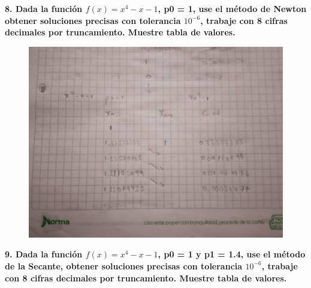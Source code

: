 \documentclass[12pt]{article}
\begin{document}
\textbf{8. Dada la función $f(x) = x^4-x- 1$, p0 = 1, use el método de Newton obtener soluciones precisas con tolerancia $10^{-6}$, trabaje con 8 cifras decimales por truncamiento. Muestre tabla de valores.} 

\begin{figure}[H]
\centering
\includegraphics[width=1\textwidth]{./inFiles/Figures/3.jpeg}
\end{figure}




\textbf{9. Dada la función $f(x) = x^4-x- 1$, p0 = 1 y p1 = 1.4, use el método de la Secante, obtener soluciones precisas con tolerancia $10^{-6}$, trabaje con 8 cifras decimales por truncamiento. Muestre tabla de valores.} 
\end{document}
